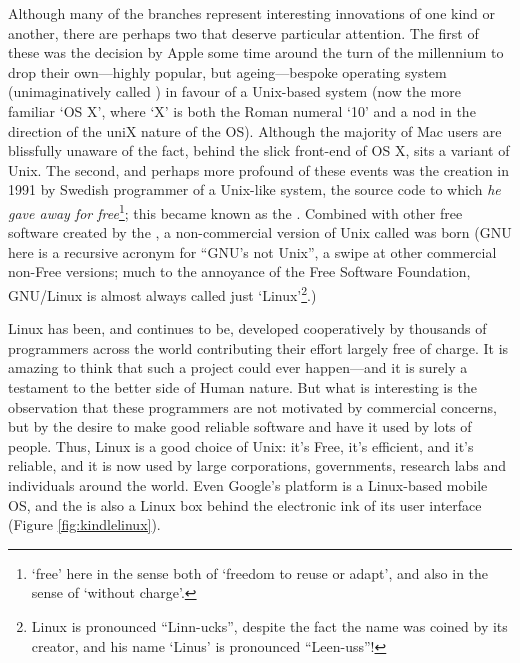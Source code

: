 Although many of the branches represent interesting innovations of one kind or another, there are perhaps two that deserve particular attention. The first of these was the decision by Apple some time around the turn of the millennium to drop their own---highly popular, but ageing---bespoke operating system (unimaginatively called ) in favour of a Unix-based system (now the more familiar `OS X', where `X' is both the Roman numeral `10' and a nod in the direction of the uniX nature of the OS). Although the majority of Mac users are blissfully unaware of the fact, behind the slick front-end of OS X, sits a variant of Unix. The second, and perhaps more profound of these events was the creation in 1991 by Swedish programmer  of a Unix-like system, the source code to which \emph{he gave away for free}\footnote{`free' here in the sense both of `freedom to reuse or adapt', and also in the sense of `without charge'.}; this became known as the . Combined with other free software created by the , a non-commercial version of Unix called  was born (GNU here is a recursive acronym for ``GNU's not Unix'', a swipe at other commercial non-Free versions; much to the annoyance of the Free Software Foundation, GNU/Linux is almost always called just `Linux'\footnote{Linux
is pronounced ``Linn-ucks'', despite the fact the name was coined by
its creator, and his name `Linus' is pronounced
``Leen-uss''!}.) 

Linux has been, and continues to be, developed cooperatively by
thousands of programmers across the world contributing their effort
largely free of charge. It is amazing to think that such
a project could ever happen---and it is surely a testament to the
better side of Human nature. But what is interesting is the
observation that these programmers are not motivated by commercial
concerns, but by the desire to make good reliable software and have it
used by lots of people. Thus, Linux is a good choice of Unix: it's
Free, it's efficient, and it's reliable, and it is now used by large corporations, governments, research labs and individuals around the world. Even Google's  platform is a Linux-based mobile OS, and the   is also a Linux box behind the electronic ink of its user interface (Figure \ref{fig:kindlelinux}).

